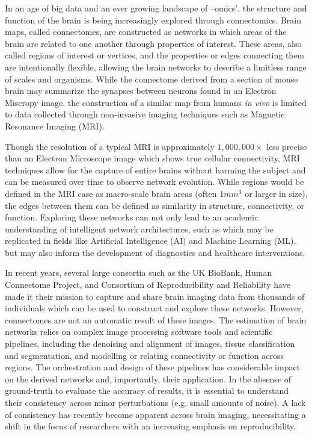 In an age of big data and an ever growing landscape of –omics', the structure and function of the brain is being
increasingly explored through connectomics. Brain maps, called connectomes, are constructed as networks in which areas
of the brain are related to one another through properties of interest. These areas, also called regions of interest or
vertices, and the properties or edges connecting them are intentionally flexible, allowing the brain networks to
describe a limitless range of scales and organisms. While the connectome derived from a section of mouse brain may
summarize the synapses between neurons found in an Electron Miscropy image, the construction of a similar map from
humans \textit{in vivo} is limited to data collected through non-invasive imaging techniques such as Magnetic Resonance
Imaging (MRI).

Though the resolution of a typical MRI is approximately $1,000,000 \times$ less precise than an Electron Microscope
image which shows true cellular connectivity, MRI techniques allow for the capture of entire brains without harming the
subject and can be measured over time to observe network evolution. While regions would be defined in the MRI case as
macro-scale brain areas (often $1mm^3$ or larger in size), the edges between them can be defined as similarity in
structure, connectivity, or function. Exploring these networks can not only lead to an academic understanding of
intelligent network architectures, such as which may be replicated in fields like Artificial Intelligence (AI) and
Machine Learning (ML), but may also inform the development of diagnostics and healthcare interventions.

In recent years, several large consortia such as the UK BioBank, Human Connectome Project, and Consortium of
Reproducibility and Reliability have made it their mission to capture and share brain imaging data from thousands of
individuals which can be used to construct and explore these networks. However, connectomes are not an automatic result
of these images. The estimation of brain networks relies on complex image processing software tools and scientific
pipelines, including the denoising and alignment of images, tissue classification and segmentation, and modelling or
relating connectivity or function across regions. The orchestration and design of these pipelines has considerable
impact on the derived networks and, importantly, their application. In the absense of ground-truth to evaluate the
accuracy of results, it is essential to understand their consistency across minor perturbations (e.g. small amounts of
noise). A lack of consistency has recently become apparent across brain imaging, necessitating a shift in the focus of
researchers with an increasing emphasis on reproducibility.

